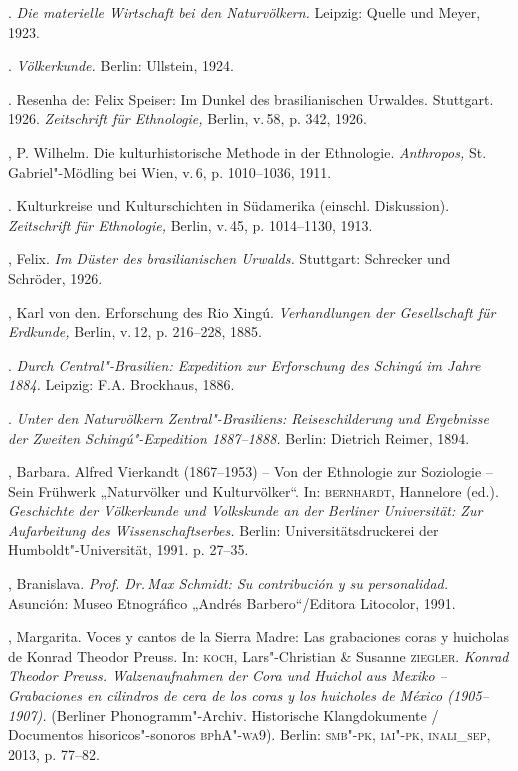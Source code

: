 \begin{bibliohedra}
\titidem. \textit{Die materielle Wirtschaft bei den
Naturvölkern.} Leipzig: Quelle und Meyer, 1923.

\titidem. \textit{Völkerkunde.} Berlin: Ullstein, 1924.

\titidem. Resenha de: Felix Speiser: Im Dunkel des
brasilianischen Urwaldes. Stuttgart. 1926. \textit{Zeitschrift für
Ethnologie,} Berlin, v.\,58, p. 342, 1926.

, P. Wilhelm. Die kulturhistorische Methode in der Ethnologie.
\textit{Anthropos,} St. Gabriel"-Mödling bei Wien, v.\,6, p. 1010--1036,
1911.

\titidem. Kulturkreise und Kulturschichten in Südamerika
(einschl. Diskussion). \textit{Zeitschrift für Ethnologie,} Berlin, v.\,45, p. 1014--1130, 1913.

, Felix. \textit{Im Düster des brasilianischen Urwalds.}
Stuttgart: Schrecker und Schröder, 1926.

, Karl von den. Erforschung des Rio Xingú. \textit{Verhandlungen
der Gesellschaft für Erdkunde,} Berlin, v.\,12, p. 216--228, 1885.

\titidem. \textit{Durch Central"-Brasilien: Expedition zur
Erforschung des Schingú im Jahre 1884.} Leipzig: F.A. Brockhaus, 1886.

\titidem. \textit{Unter den Naturvölkern Zentral"-Brasiliens:
Reiseschilderung und Ergebnisse der Zweiten Schingú"-Expedition
1887--1888.} Berlin: Dietrich Reimer, 1894.

, Barbara. Alfred Vierkandt (1867--1953) -- Von der Ethnologie zur
Soziologie -- Sein Frühwerk „Naturvölker und Kulturvölker``. In:
\textsc{bernhardt}, Hannelore (ed.). \textit{Geschichte der Völkerkunde und
Volkskunde an der Berliner Universität: Zur Aufarbeitung des
Wissenschaftserbes.} Berlin: Universitätsdruckerei der
Humboldt"-Universität, 1991. p. 27--35.

, Branislava. \textit{Prof. Dr.\,Max Schmidt: Su contribución y su
personalidad.} Asunción: Museo Etnográfico „Andrés Barbero``/Editora
Litocolor, 1991.

, Margarita. Voces y cantos de la Sierra Madre: Las
grabaciones coras y huicholas de Konrad Theodor Preuss. In: \textsc{koch},
Lars"-Christian \& Susanne \textsc{ziegler}. \textit{Konrad Theodor Preuss.
Walzenaufnahmen der Cora und Huichol aus Mexiko -- Grabaciones en
cilindros de cera de los coras y los huicholes de México (1905--1907).}
(Berliner Phonogramm"-Archiv. Historische Klangdokumente / Documentos
hisoricos"-sonoros \textsc{bp}h\textsc{A}"-\textsc{wa}9). Berlin: \textsc{smb"-pk, iai"-pk, inali\_sep}, 2013,
p. 77--82.


\end{bibliohedra}
